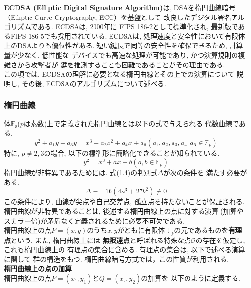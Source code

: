 \textbf{ECDSA (Elliptic Digital Signature Algorithm)}は, 
DSAを楕円曲線暗号（Elliptic Curve Cryptography, ECC）を基盤として
改良したデジタル署名アルゴリズムである.
ECDSAは, 2000年に FIPS 186-2として標準化され, 
最新版であるFIPS 186-5\cite{fips186-5}でも採用されている.
ECDSAは, 処理速度と安全性において有限体上のDSAよりも優位性がある. 
短い鍵長で同等の安全性を確保できるため, 計算量が少なく, 低性能な
デバイスでも高速な処理が可能であり, かつ演算規則の複雑さから攻撃者が
鍵を推測することも困難であることがその理由である. \\
\indent この項では, ECDSAの理解に必要となる楕円曲線とその上での演算について
説明し, その後, ECDSAのアルゴリズムについて述べる.\\

\subsubsection{楕円曲線}
体$\mathbb{F}_p$($p$は素数)上で定義された楕円曲線とは以下の式で与えられる
代数曲線である.
\[
  y^2+a_1y+a_3y=x^3+a_2x^2+a_4x+a_6　　(a_1,a_2,a_3,a_4,a_6\in\mathbb{F}_p)
\]
特に, $p\neq 2,3$の場合, 以下の標準形に簡略化できることが知られている.
\begin{equation}
  y^2=x^3+ax+b　　(a,b\in\mathbb{F}_p)
\end{equation}
楕円曲線が非特異であるためには, 式(1.4)の判別式$\Delta$が次の条件を
満たす必要がある.
\begin{equation}
  \Delta=-16(4a^3+27b^2)\neq 0
\end{equation}
この条件により, 曲線が尖点や自己交差点, 孤立点を持たないことが保証される.
楕円曲線が非特異であることは, 後述する楕円曲線上の点に対する演算
(加算やスカラー倍)が矛盾なく定義されるために必要不可欠である.\\
\indent 楕円曲線上の点$P=(x,y)$のうち$x,y$がともに有限体
$\mathbb{F}_p$の元であるものを\textbf{有理点}という. また, 楕円曲線上には
\textbf{無限遠点}と呼ばれる特殊な点$\mathcal{O}$の存在を仮定し, これも楕円曲線上の
有理点の集合に含める. 有理点の集合は, 以下で述べる演算に関して
群の構造をもつ. 楕円曲線暗号方式では，この性質が利用される.\\[1em]
\noindent\textbf{楕円曲線上の点の加算}\\
\indent 楕円曲線上の点$P=(x_1,y_1)$と$Q=(x_2,y_2)$の加算を
以下のように定義する.
